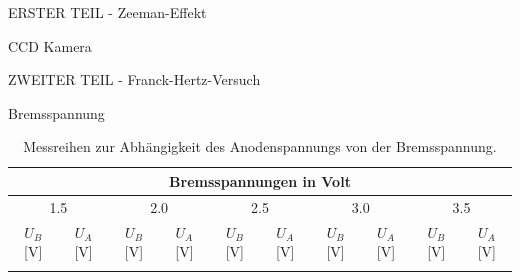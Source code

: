 \begin{appendix}
\begin{chapter}{ERSTER TEIL - Zeeman-Effekt}
\begin{section}{CCD Kamera}
    \end{section}
    
  \end{chapter}
  
  
  
  \begin{chapter}{ZWEITER TEIL - Franck-Hertz-Versuch}
    \label{Anhang:chp:ZWEITERTEIL}
    
    
    
    \begin{section}{Bremsspannung}
      \label{Anhang:chp:ZWEITERTEILbremsspannung}
      
      \begin{scriptsize}
        \begin{longtable}[htbp]{|c|c|c|c|c|c|c|c|c|c|}
          \hline
          \multicolumn{10}{|c|}{Bremsspannungen in Volt} \\ \hline 
          \multicolumn{2}{|c|}{1.5} & \multicolumn{2}{|c|}{2.0} &
          \multicolumn{2}{|c|}{2.5} & \multicolumn{2}{|c|}{3.0} & 
          \multicolumn{2}{|c|}{3.5} \\ \hline
          $U_{B}$ [V] & $U_{A}$ [V] & $U_{B}$ [V] & $U_{A}$ [V] &
          $U_{B}$ [V] & $U_{A}$ [V] & $U_{B}$ [V] & $U_{A}$ [V] &
          $U_{B}$ [V] & $U_{A}$ [V] \\ \hline\hline \endhead
          
          \caption{Messreihen zur Abhängigkeit des Anodenspannungs von der
              Bremsspannung.}
          \label{tab:FHbremsspannung}
        \end{longtable}
      \end{scriptsize}
      

\end{section}
\end{chapter}
\end{appendix}
